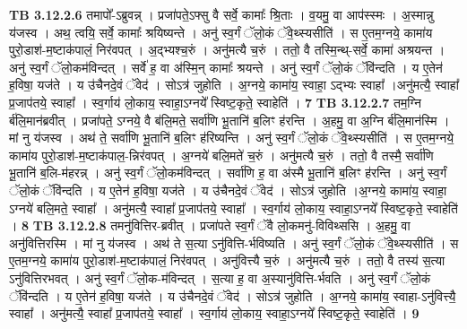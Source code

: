 \documentclass[17pt]{extarticle}
\begin{document}
{{{{{{{{{{{{{{{{{{{{{{{                                \textbf{ TB 3.12.2.6} \newline
                  तमापो᳚-ऽब्रुवन्न् । प्रजा॑पते॒ऽफ्सु वै सर्वे॒ कामाः᳚ श्रि॒ताः । व॒यमु॒ वा आप॑स्स्मः । अ॒स्मान्नु य॑जस्व । अथ॒ त्वयि॒ सर्वे॒ कामाः᳚ श्रयिष्यन्ते । अनु॑ स्व॒र्गं ॅलो॒कं ॅवे॒थ्स्यसीति॑ । स ए॒तम॒ग्नये॒ कामा॑य पुरो॒डाश॑-म॒ष्टाक॑पालं॒ निर॑वपत् । अ॒द्भ्यश्च॒रुं । अनु॑मत्यै च॒रुं । ततो॒ वै तस्मि॒न्थ्-सर्वे॒ कामा॑ अश्रयन्त । अनु॑ स्व॒र्गं ॅलो॒कम॑विन्दत् । सर्वे॑ ह॒ वा अ॑स्मि॒न् कामाः᳚ श्रयन्ते । अनु॑ स्व॒र्गं ॅलो॒कं ॅवि॑न्दति । य ए॒तेन॑ ह॒विषा॒ यज॑ते । य उ॑चैनदे॒वं ॅवेद॑ । सोऽत्र॑ जुहोति । अ॒ग्नये॒ कामा॑य॒ स्वाहा॒ ऽद्भ्यः स्वाहा᳚ ।अनु॑मत्यै॒ स्वाहा᳚ प्र॒जाप॑तये॒ स्वाहा᳚ । स्व॒र्गाय॑ लो॒काय॒ स्वाहा॒ऽग्नये᳚ स्विष्ट॒कृते॒ स्वाहेति॑ । \textbf{ 7} \newline
                  \newline
                                \textbf{ TB 3.12.2.7} \newline
                  तम॒ग्नि र्ब॑लि॒मान॑ब्रवीत् । प्रजा॑पते॒ ऽग्नये॒ वै ब॑लि॒मते॒ सर्वा॑णि भू॒तानि॑ ब॒लिꣳ ह॑रन्ति । अ॒हमु॒ वा अ॒ग्नि र्ब॑लि॒मान॑स्मि । मां नु य॑जस्व । अथ॑ ते॒ सर्वा॑णि भू॒तानि॑ ब॒लिꣳ ह॑रिष्यन्ति । अनु॑ स्व॒र्गं ॅलो॒कं ॅवे॒थ्स्यसीति॑ । स ए॒तम॒ग्नये॒ कामा॑य पुरो॒डाश॑-म॒ष्टाक॑पाल॒-न्निर॑वपत् । अ॒ग्नये॑ बलि॒मते॑ च॒रुं । अनु॑मत्यै च॒रुं । ततो॒ वै तस्मै॒ सर्वा॑णि भू॒तानि॑ ब॒लि-म॑हरन्न् । अनु॑ स्व॒र्गं ॅलो॒कम॑विन्दत् । सर्वा॑णि ह॒ वा अ॑स्मै भू॒तानि॑ ब॒लिꣳ ह॑रन्ति । अनु॑ स्व॒र्गं ॅलो॒कं ॅवि॑न्दति । य ए॒तेन॑ ह॒विषा॒ यज॑ते । य उ॑चैनदे॒वं ॅवेद॑ । सोऽत्र॑ जुहोति ।अ॒ग्नये॒ कामा॑य॒ स्वाहा॒ ऽग्नये॑ बलि॒मते॒ स्वाहा᳚ । अनु॑मत्यै॒ स्वाहा᳚ प्र॒जाप॑तये॒ स्वाहा᳚ । स्व॒र्गाय॑ लो॒काय॒ स्वाहा॒ऽग्नये᳚ स्विष्ट॒कृते॒ स्वाहेति॑ । \textbf{ 8} \newline
                  \newline
                                \textbf{ TB 3.12.2.8} \newline
                  तमनु॑वित्तिर-ब्रवीत् । प्रजा॑पते स्व॒र्गं ॅवै लो॒कमनु॑-विविथ्ससि । अ॒हमु॒ वा अनु॑वित्तिरस्मि । मां नु य॑जस्व । अथ॑ ते स॒त्या ऽनु॑वित्ति-र्भविष्यति । अनु॑ स्व॒र्गं ॅलो॒कं ॅवे॒थ्स्यसीति॑ । स ए॒तम॒ग्नये॒ कामा॑य पुरो॒डाश॑-म॒ष्टाक॑पालं॒ निर॑वपत् । अनु॑वित्त्यै च॒रुं । अनु॑मत्यै च॒रुं । ततो॒ वै तस्य॑ स॒त्या ऽनु॑वित्तिरभवत् । अनु॑ स्व॒र्गं ॅलो॒क-म॑विन्दत् । स॒त्या ह॒ वा अ॒स्यानु॑वित्ति-र्भवति । अनु॑ स्व॒र्गं ॅलो॒कं ॅवि॑न्दति । य ए॒तेन॑ ह॒विषा॒ यज॑ते । य उ॑चैनदे॒वं ॅवेद॑ । सोऽत्र॑ जुहोति । अ॒ग्नये॒ कामा॑य॒ स्वाहा-ऽनु॑वित्त्यै॒ स्वाहा᳚ । अनु॑मत्यै॒ स्वाहा᳚ प्र॒जाप॑तये॒ स्वाहा᳚ । स्व॒र्गाय॑ लो॒काय॒ स्वाहा॒ऽग्नये᳚ स्विष्ट॒कृते॒ स्वाहेति॑ । \textbf{ 9} \newline
}}}}}}}}}}}}}}}}}}}}}}}
\end{document}
